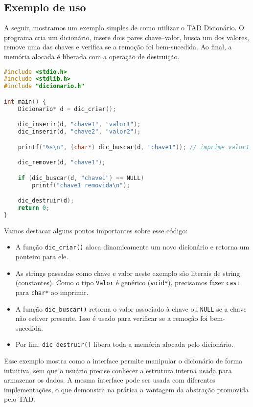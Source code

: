 \subsection{Exemplo de uso}

A seguir, mostramos um exemplo simples de como utilizar o TAD Dicionário. 
O programa cria um dicionário, insere dois pares chave–valor, busca um dos valores, remove uma das chaves e verifica se a remoção foi bem-sucedida. 
Ao final, a memória alocada é liberada com a operação de destruição.

\begin{lstlisting}[language=C, caption={Exemplo de uso do TAD Dicionário}, label={lst:exemplo-uso}]
#include <stdio.h>
#include <stdlib.h>
#include "dicionario.h"

int main() {
	Dicionario* d = dic_criar();

	dic_inserir(d, "chave1", "valor1");
	dic_inserir(d, "chave2", "valor2");

	printf("%s\n", (char*) dic_buscar(d, "chave1")); // imprime valor1

	dic_remover(d, "chave1");

	if (dic_buscar(d, "chave1") == NULL)
    	printf("chave1 removida\n");

	dic_destruir(d);
	return 0;
}
\end{lstlisting}

Vamos destacar alguns pontos importantes sobre esse código:

\begin{itemize}
\item A função \verb|dic_criar()| aloca dinamicamente um novo dicionário e retorna um ponteiro para ele.
\item As strings passadas como chave e valor neste exemplo são literais de string (constantes). 
Como o tipo \verb|Valor| é genérico (\verb|void*|), precisamos fazer \verb|cast| para \verb|char*| ao imprimir.
\item A função \verb|dic_buscar()| retorna o valor associado à chave ou \verb|NULL| se a chave não estiver presente. Isso é usado para verificar se a remoção foi bem-sucedida.
\item Por fim, \verb|dic_destruir()| libera toda a memória alocada pelo dicionário.
\end{itemize}

Esse exemplo mostra como a interface permite manipular o dicionário de forma intuitiva, sem que o usuário precise conhecer a estrutura interna usada para armazenar os dados. 
A mesma interface pode ser usada com diferentes implementações, o que demonstra na prática a vantagem da abstração promovida pelo TAD.

